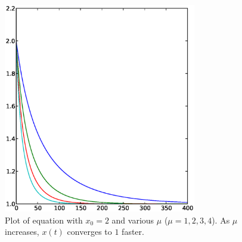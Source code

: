 \documentclass[10pt,twoside,draft]{book}
\begin{document}
\begin{figure}[h]
  \begin{center}
    \includegraphics[width=0.75\textwidth]{logistic_diffeq_mu1234_x2}
  \end{center}
  \caption{
    Plot of equation  with $x_0 = 2$ and various $\mu$ ($\mu = 1,2,3,4$).
    As $\mu$ increases, $x(t)$ converges to $1$ faster.
  }
  \label{fig:lde2}
\end{figure}
\end{document}
